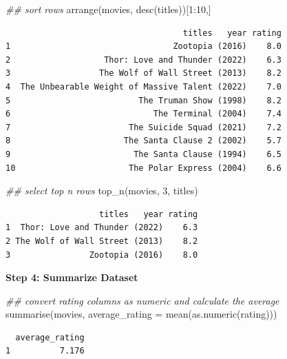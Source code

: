 \documentclass[
  letterpaper,
  DIV=11,
  numbers=noendperiod]{scrreprt}
\newenvironment{Shaded}{\begin{snugshade}}{\end{snugshade}}
\newcommand{\AttributeTok}[1]{\textcolor[rgb]{0.40,0.45,0.13}{#1}}
\newcommand{\DecValTok}[1]{\textcolor[rgb]{0.68,0.00,0.00}{#1}}
\newcommand{\DocumentationTok}[1]{\textcolor[rgb]{0.37,0.37,0.37}{\textit{#1}}}
\newcommand{\FunctionTok}[1]{\textcolor[rgb]{0.28,0.35,0.67}{#1}}
\newcommand{\NormalTok}[1]{\textcolor[rgb]{0.00,0.23,0.31}{#1}}
\newcommand{\SpecialCharTok}[1]{\textcolor[rgb]{0.37,0.37,0.37}{#1}}
\begin{document}
\begin{Shaded}
\begin{Highlighting}[]
\DocumentationTok{\#\# sort rows}
\FunctionTok{arrange}\NormalTok{(movies, }\FunctionTok{desc}\NormalTok{(titles))[}\DecValTok{1}\SpecialCharTok{:}\DecValTok{10}\NormalTok{,]}
\end{Highlighting}
\end{Shaded}

\begin{verbatim}
                                    titles   year rating
1                                 Zootopia (2016)    8.0
2                   Thor: Love and Thunder (2022)    6.3
3                  The Wolf of Wall Street (2013)    8.2
4  The Unbearable Weight of Massive Talent (2022)    7.0
5                          The Truman Show (1998)    8.2
6                             The Terminal (2004)    7.4
7                        The Suicide Squad (2021)    7.2
8                       The Santa Clause 2 (2002)    5.7
9                         The Santa Clause (1994)    6.5
10                       The Polar Express (2004)    6.6
\end{verbatim}

\begin{Shaded}
\begin{Highlighting}[]
\DocumentationTok{\#\# select top n rows}
\FunctionTok{top\_n}\NormalTok{(movies, }\DecValTok{3}\NormalTok{, titles)}
\end{Highlighting}
\end{Shaded}

\begin{verbatim}
                   titles   year rating
1  Thor: Love and Thunder (2022)    6.3
2 The Wolf of Wall Street (2013)    8.2
3                Zootopia (2016)    8.0
\end{verbatim}

\textbf{Step 4: Summarize Dataset}

\begin{Shaded}
\begin{Highlighting}[]
\DocumentationTok{\#\# convert rating columns as numeric and calculate the average}
\FunctionTok{summarise}\NormalTok{(movies, }\AttributeTok{average\_rating =} \FunctionTok{mean}\NormalTok{(}\FunctionTok{as.numeric}\NormalTok{(rating)))}
\end{Highlighting}
\end{Shaded}

\begin{verbatim}
  average_rating
1          7.176
\end{verbatim}
\end{document}
